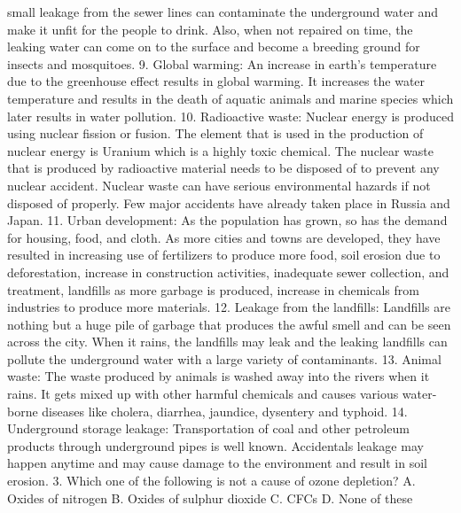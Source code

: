 small leakage from the sewer lines can contaminate the underground water and make it unfit for the people to drink. Also, when not repaired on time, the leaking water can come on to the surface and become a breeding ground for insects and mosquitoes. 9. Global warming: An increase in earth’s temperature due to the greenhouse effect results in global warming. It increases the water temperature and results in the death of aquatic animals and marine species which later results in water pollution. 10. Radioactive waste: Nuclear energy is produced using nuclear fission or fusion. The element that is used in the production of nuclear energy is Uranium which is a highly toxic chemical. The nuclear waste that is produced by radioactive material needs to be disposed of to prevent any nuclear accident. Nuclear waste can have serious environmental hazards if not disposed of properly. Few major accidents have already taken place in Russia and Japan. 11. Urban development: As the population has grown, so has the demand for housing, food, and cloth. As more cities and towns are developed, they have resulted in increasing use of fertilizers to produce more food, soil erosion due to deforestation, increase in construction activities, inadequate sewer collection, and treatment, landfills as more garbage is produced, increase in chemicals from industries to produce more materials. 12. Leakage from the landfills: Landfills are nothing but a huge pile of garbage that produces the awful smell and can be seen across the city. When it rains, the landfills may leak and the leaking landfills can pollute the underground water with a large variety of contaminants. 13. Animal waste: The waste produced by animals is washed away into the rivers when it rains. It gets mixed up with other harmful chemicals and causes various water-borne diseases like cholera, diarrhea, jaundice, dysentery and typhoid. 14. Underground storage leakage: Transportation of coal and other petroleum products through underground pipes is well known. Accidentals leakage may happen anytime and may cause damage to the environment and result in soil erosion. 3. Which one of the following is not a cause of ozone depletion? A. Oxides of nitrogen B. Oxides of sulphur dioxide C. CFCs D. None of these 

